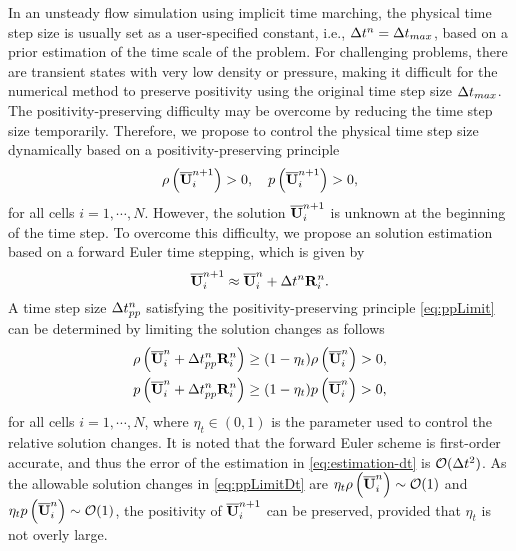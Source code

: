 In an unsteady flow simulation using implicit time marching, the physical time step size is usually set as a user-specified constant, i.e., $\mathrm\Delta t^n= \mathrm\Delta t_{max}$, based on a prior estimation of the time scale of the problem. For challenging problems, there are transient states with very low density or pressure, making it difficult for the numerical method to preserve positivity using the original time step size $\mathrm\Delta t_{max}$.
The positivity-preserving difficulty may be overcome by reducing the time step size temporarily. Therefore, we propose to control the physical time step size dynamically based on a positivity-preserving principle
\begin{equation}
		\label{eq:ppLimit} 
			\rho\left(\overline{\mathbf{U}}_i^{n+1} \right)>0, \quad 
			p\left(\overline{\mathbf{U}}_i^{n+1}\right)>0 ,
\end{equation}
for all cells $i=1, \cdots,N$.
However, the solution $\overline{\mathbf{U}}_i^{n+1}$ is unknown at the beginning of the time step. To overcome this difficulty, we propose an solution estimation based on a forward Euler time stepping, which is given by
\begin{equation}
	\label{eq:estimation-dt}
	\overline{\mathbf{U}}_i^{n+1} \approx  \overline{\mathbf{U}}_i^n + \mathrm\Delta t^{n}  \mathbf{R}_i^n.
\end{equation}
 A time step size $ \mathrm\Delta t^{n}_{pp}$ satisfying the positivity-preserving principle \eqref{eq:ppLimit} can be determined by limiting the solution changes as follows
\begin{equation}
    \label{eq:ppLimitDt}
    \begin{aligned}
        \rho\left(\overline{\mathbf{U}}_i^n + \mathrm\Delta t^{n}_{pp}\mathbf{R}_i^n\right)
         & \geq
        (1- \eta_t)
        \rho\left(\overline{\mathbf{U}}_i^n\right)>0, \\
        p\left(\overline{\mathbf{U}}_i^n + \mathrm\Delta t^{n}_{pp}\mathbf{R}_i^n\right)
         & \geq
        (1- \eta_t)
        p\left(\overline{\mathbf{U}}_i^n\right)>0,
    \end{aligned}
\end{equation}
for all cells $i=1, \cdots,N$, where $\eta_t\in(0,1)$ is the parameter used to control the relative solution changes. It is noted that the forward Euler scheme is first-order accurate, and thus the error of the estimation in \eqref{eq:estimation-dt} is $\mathcal{O}(\mathrm\Delta t^2)$. As the allowable solution changes in \eqref{eq:ppLimitDt} are $\eta_t \rho\left(\overline{\mathbf{U}}_i^n\right) \sim \mathcal{O}(1)$ and $\eta_t p\left(\overline{\mathbf{U}}_i^n\right) \sim \mathcal{O}(1)$, the positivity of $\overline{\mathbf{U}}_i^{n+1}$  can be preserved, provided that $\eta_t$ is not overly large.

